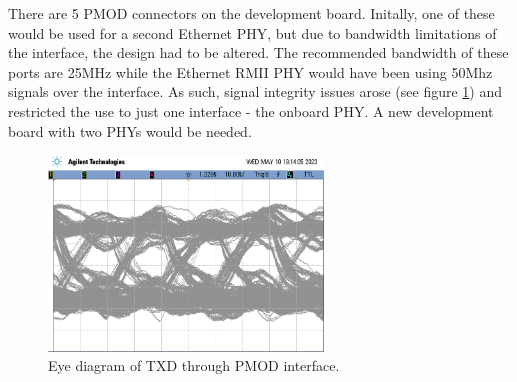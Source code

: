 There are 5 PMOD connectors on the development board. Initally, one of these would be used for a second Ethernet PHY, but due to bandwidth limitations of the interface, the design had to be altered. The recommended bandwidth of these ports are 25MHz while the Ethernet RMII PHY would have been using 50Mhz signals over the interface. As such, signal integrity issues arose (see figure \ref{fig:eye_diagram}) and restricted the use to just one interface - the onboard PHY. A new development board with two PHYs would be needed.

\begin{figure}[h]
    \centering
    \includegraphics[width=0.65\textwidth]{Images/EyeDiagramTX.png}
    \caption[Eye diagram of TXD through PMOD interface]{Eye diagram of TXD through PMOD interface.}
    \label{fig:eye_diagram}
\end{figure}